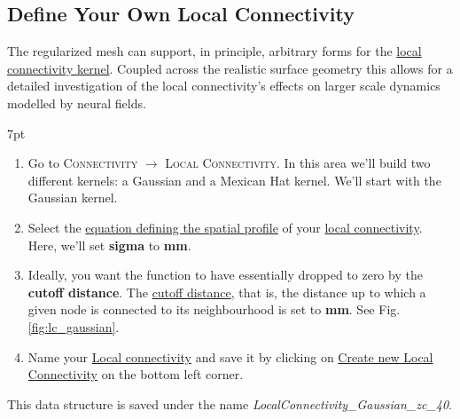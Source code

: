 \documentclass{tufte-handout}
\newenvironment{formal}{%
  \def\FrameCommand{%
    \hspace{1pt}%
    {\color{DarkBlue}\vrule width 2pt}%
    {\color{formalshade}\vrule width 4pt}%
    \colorbox{formalshade}%
  }%
  \MakeFramed{\advance\hsize-\width\FrameRestore}%
  \noindent\hspace{-4.55pt}%
  \begin{adjustwidth}{}{7pt}%
  \vspace{2pt}\vspace{2pt}%
}
{%
  \vspace{2pt}\end{adjustwidth}\endMakeFramed%
}
\begin{document}
\subsection{Define Your Own Local Connectivity}\label{sec:local_connectivity}

The regularized mesh can support, in principle, arbitrary forms for the
\underline{local connectivity kernel}. Coupled across the realistic surface geometry this
allows for a detailed investigation of the local connectivity's effects on
larger scale dynamics modelled by neural fields.



\begin{formal}
\begin{enumerate}
\item Go to \textsc{Connectivity} $\rightarrow$ \textsc{Local Connectivity}. 
In this area we'll build two different kernels: a Gaussian and a Mexican Hat kernel. 
We'll start with the Gaussian kernel. 
\item Select the \underline{equation defining the spatial profile} of your \underline{local connectivity}. Here, we'll set \textbf{sigma} to \textbf{\unit[15]{mm}}.
\item Ideally, you want the function to have essentially dropped to zero by the \textbf{cutoff distance}. The \underline{cutoff distance}, that is, the distance up to which a given node is connected to its neighbourhood \citep{Spiegler_2013, Sanz-Leon_2014} is set to \textbf{\unit[40]{mm}}. See Fig. \ref{fig:lc_gaussian}.
\item Name your \underline{Local connectivity} and save it by clicking on \underline{Create new Local Connectivity} on the bottom left corner. 
\end{enumerate}
\end{formal}
This data structure is saved under the name \textit{LocalConnectivity\_Gaussian\_zc\_40}.
\end{document}
